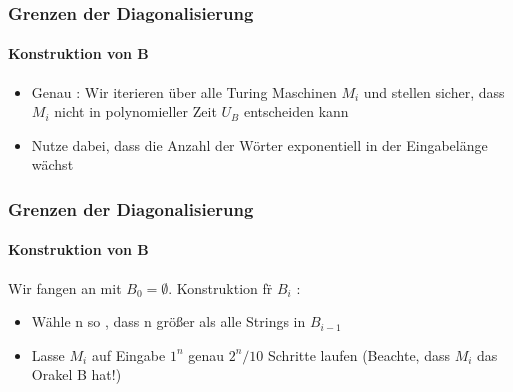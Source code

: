 \begin{frame}
	\frametitle{Grenzen der Diagonalisierung}
	\framesubtitle{Konstruktion von B}
	\begin{itemize}[<+->]
	\item Genau : Wir iterieren über alle Turing Maschinen $M_i$ und stellen
	sicher, dass $M_i$ nicht in polynomieller Zeit $U_B$ entscheiden kann
	\item Nutze dabei, dass die Anzahl der Wörter exponentiell in der Eingabelänge wächst
	\end{itemize}
\end{frame}

\begin{frame}
	\frametitle{Grenzen der Diagonalisierung}
	\framesubtitle{Konstruktion von B}
	Wir fangen an mit $B_0 = \emptyset$. Konstruktion f\"r $B_i$ :
	\begin{itemize}[<+->]
		\item Wähle n so , dass n größer als alle Strings in $B_{i-1}$
		\item Lasse $M_i$ auf Eingabe $1^n$ genau $2^n / 10$ Schritte laufen \newline
			(Beachte, dass $M_i$ das Orakel B hat!)
	\end{itemize}
\end{frame}
